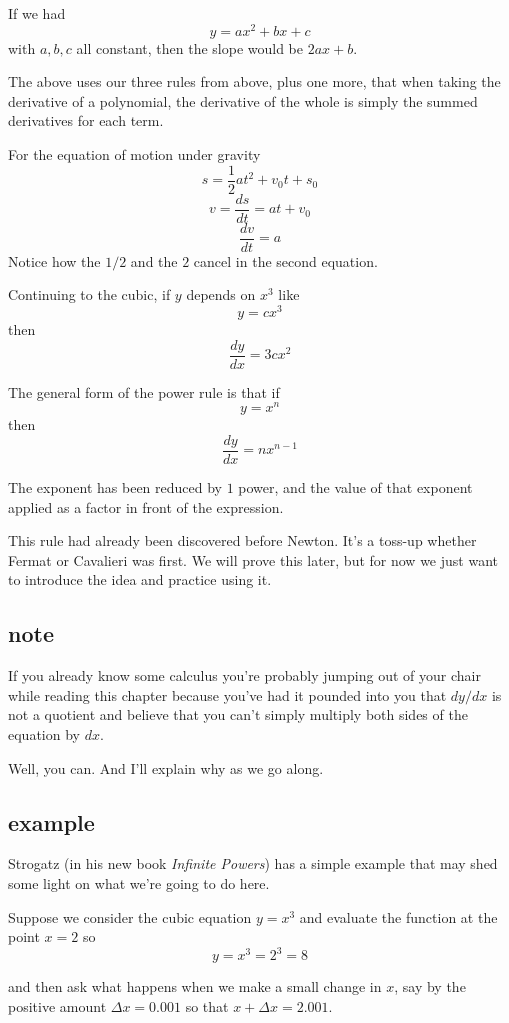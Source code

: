 \documentclass[11pt, oneside]{article}
\begin{document}
If we had
\[ y = ax^2 + bx + c \]
with $a,b,c$ all constant, then the slope would be $2ax + b$.  

The above uses our three rules from above, plus one more, that when taking the derivative of a polynomial, the derivative of the whole is simply the summed derivatives for each term.

For the equation of motion under gravity
\[ s = \frac{1}{2} a t^2 + v_0 t + s_0 \]
\[ v = \frac{ds}{dt} = at + v_0 \]
\[ \frac{dv}{dt} = a \]
Notice how the $1/2$ and the $2$ cancel in the second equation.

Continuing to the cubic, if $y$ depends on $x^3$ like
\[ y = cx^3 \]
then
\[ \frac{dy}{dx} = 3cx^2 \]

The general form of the power rule is that if
\[ y = x^n \]
then
\[ \frac{dy}{dx} = n x^{n-1} \]

The exponent has been reduced by $1$ power, and the value of that exponent applied as a factor in front of the expression.

This rule had already been discovered before Newton.  It's a toss-up whether Fermat or Cavalieri was first.  We will prove this later, but for now we just want to introduce the idea and practice using it.

\subsection*{note}
If you already know some calculus you're probably jumping out of your chair while reading this chapter because you've had it pounded into you that $dy/dx$ is not a quotient and believe that you can't simply multiply both sides of the equation by $dx$.

Well, you can.  And I'll explain why as we go along.

\subsection*{example}

Strogatz (in his new book \emph{Infinite Powers}) has a simple example that may shed some light on what we're going to do here.

Suppose we consider the cubic equation $y = x^3$ and evaluate the function at the point $x = 2$ so
\[ y = x^3 = 2^3 = 8 \]

and then ask what happens when we make a small change in $x$, say by the positive amount $\Delta x = 0.001$ so that $x + \Delta x = 2.001$.
\end{document}
